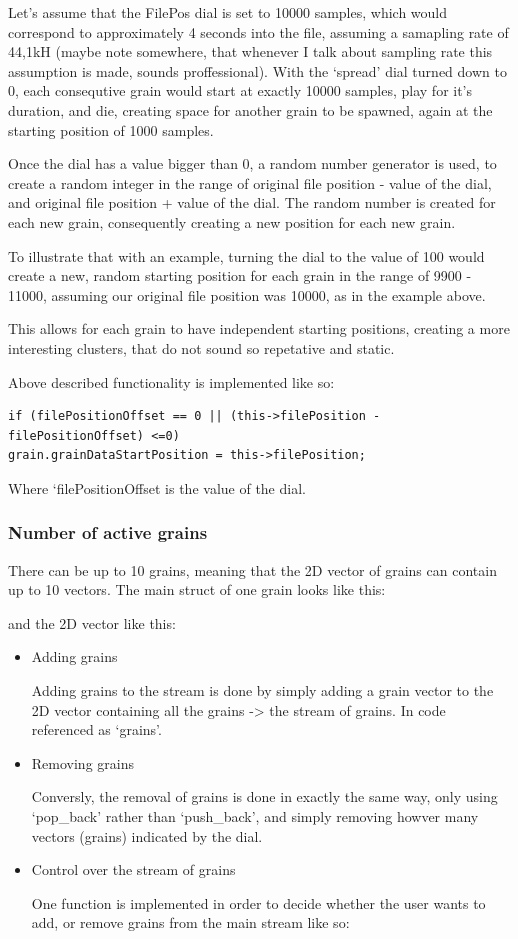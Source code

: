 Let's assume that the FilePos dial is set to 10000 samples, which
would correspond to approximately 4 seconds into the file, assuming a
samapling rate of 44,1kH (maybe note somewhere, that whenever I talk
about sampling rate this assumption is made, sounds
proffessional). With the `spread' dial turned down to 0, each
consequtive grain would start at exactly 10000 samples, play for it's
duration, and die, creating space for another grain to be spawned,
again at the starting position of 1000 samples.

Once the dial has a value bigger than 0, a random number generator is
used, to create a random integer in the range of original file
position - value of the dial, and original file position + value of
the dial. The random number is created for each new grain,
consequently creating a new position for each new grain.

To illustrate that with an example, turning the dial to the value of
100 would create a new, random starting position for each grain in the
range of 9900 - 11000, assuming our original file position was 10000,
as in the example above.

This allows for each grain to have independent starting positions,
creating a more interesting clusters, that do not sound so repetative
and static.

Above described functionality is implemented like so:

\begin{lstlisting}
if (filePositionOffset == 0 || (this->filePosition -
filePositionOffset) <=0)
grain.grainDataStartPosition = this->filePosition;
\end{lstlisting}

Where `filePositionOffset is the value of the dial.
\subsubsection{Number of active grains}
There can be up to 10 grains, meaning that the 2D vector of
grains can contain up to 10 vectors. The main struct of one grain
looks like this:

and the 2D vector like this:

\begin{itemize}
\item Adding grains

Adding grains to the stream is done by simply adding a grain vector to
the 2D vector containing all the grains -> the stream of grains. In
code referenced as `grains'.

\item Removing grains

Conversly, the removal of grains is done in exactly the same way, only
using `pop\_back' rather than `push\_back', and simply removing howver
many vectors (grains) indicated by the dial. 

\item Control over the stream of grains

One function is implemented in order to decide whether the user wants
to add, or remove grains from the main stream like so:
\end{itemize}

